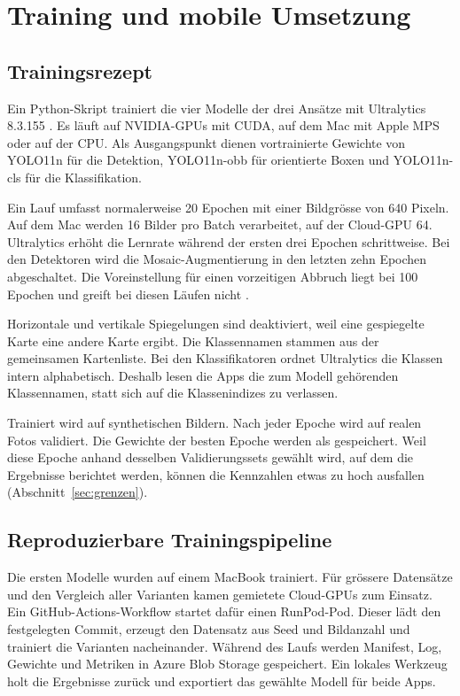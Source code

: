 \section{Training und mobile Umsetzung}\label{sec:training}

\subsection{Trainingsrezept}\label{sec:rezept}

Ein Python-Skript trainiert die vier Modelle der drei Ansätze mit
Ultralytics 8.3.155 \cite{jocher2024ultralytics}. Es läuft auf
NVIDIA-GPUs mit CUDA, auf dem Mac mit Apple MPS oder auf der CPU.
Als Ausgangspunkt dienen
vortrainierte Gewichte von YOLO11n für die Detektion, YOLO11n-obb für
orientierte Boxen und YOLO11n-cls für die Klassifikation.

Ein Lauf umfasst normalerweise 20 Epochen mit einer Bildgrösse von
640 Pixeln. Auf dem Mac werden 16 Bilder pro Batch verarbeitet, auf der
Cloud-GPU 64. Ultralytics erhöht die Lernrate während der ersten drei
Epochen schrittweise. Bei den Detektoren wird die Mosaic-Augmentierung
in den letzten zehn Epochen abgeschaltet. Die Voreinstellung für einen
vorzeitigen Abbruch liegt bei 100 Epochen und greift bei diesen Läufen
nicht \cite{ultralytics2026cfg}.

Horizontale und vertikale Spiegelungen sind deaktiviert, weil eine
gespiegelte Karte eine andere Karte ergibt. Die Klassennamen stammen
aus der gemeinsamen Kartenliste. Bei den Klassifikatoren ordnet
Ultralytics die Klassen intern alphabetisch. Deshalb lesen die Apps
die zum Modell gehörenden Klassennamen, statt sich auf die
Klassenindizes zu verlassen.

Trainiert wird auf synthetischen Bildern. Nach jeder Epoche wird auf
realen Fotos validiert. Die Gewichte der besten Epoche werden als
 gespeichert. Weil diese Epoche anhand desselben
Validierungssets gewählt wird, auf dem die Ergebnisse berichtet
werden, können die Kennzahlen etwas zu hoch ausfallen
(Abschnitt~\ref{sec:grenzen}).

\subsection{Reproduzierbare Trainingspipeline}\label{sec:pipeline}

Die ersten Modelle wurden auf einem MacBook trainiert. Für grössere
Datensätze und den Vergleich aller Varianten kamen gemietete
Cloud-GPUs zum Einsatz. Ein GitHub-Actions-Workflow startet dafür
einen RunPod-Pod. Dieser lädt den festgelegten Commit, erzeugt den
Datensatz aus Seed und Bildanzahl und trainiert die Varianten
nacheinander. Während des Laufs werden Manifest, Log, Gewichte und
Metriken in Azure Blob Storage gespeichert. Ein lokales Werkzeug
holt die Ergebnisse zurück und exportiert das gewählte Modell für
beide Apps.

